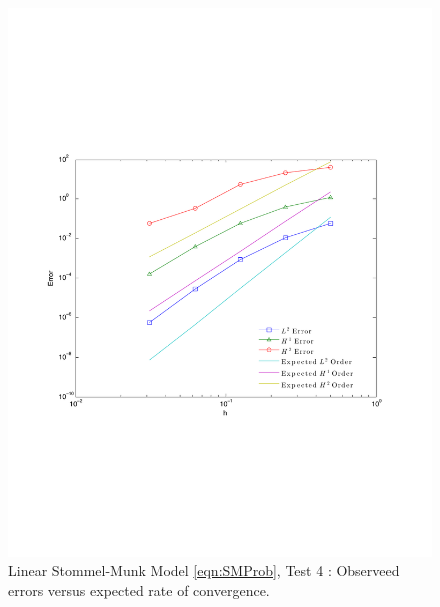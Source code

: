 \begin{figure}
  \begin{center}
    \includegraphics[scale=0.5]{Figures/SMeConvergence.pdf}
    \caption{Linear Stommel-Munk Model \eqref{eqn:SMProb}, Test 4 \cite{Cascon}:
      Observeed errors versus expected rate of convergence.}
    \label{fig:SMeErrors}
  \end{center}
\end{figure}

